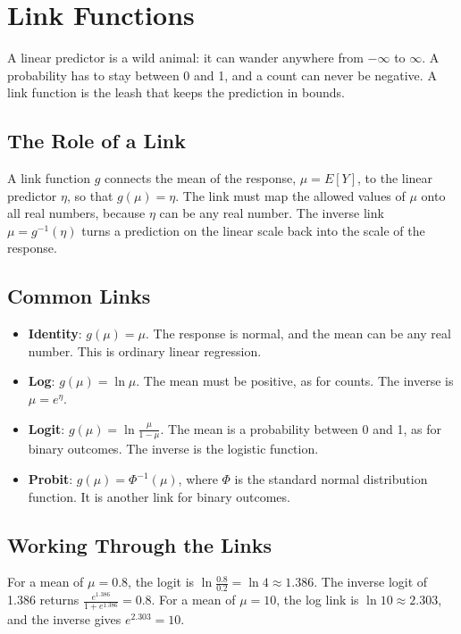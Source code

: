 \chapter{Link Functions}

A linear predictor is a wild animal: it can wander anywhere from $-\infty$ to
$\infty$. A probability has to stay between 0 and 1, and a count can never be
negative. A link function is the leash that keeps the prediction in bounds.

\section{The Role of a Link}
A link function $g$ connects the mean of the response, $\mu = E[Y]$, to the linear predictor $\eta$, so that $g(\mu) = \eta$.
The link must map the allowed values of $\mu$ onto all real numbers, because $\eta$ can be any real number. The
inverse link $\mu = g^{-1}(\eta)$ turns a prediction on the linear scale back into the scale of the response.

\section{Common Links}
\begin{itemize}
\item \textbf{Identity}: $g(\mu) = \mu$. The response is normal, and the mean can be any real number. This is ordinary linear regression.
\item \textbf{Log}: $g(\mu) = \ln \mu$. The mean must be positive, as for counts. The inverse is $\mu = e^{\eta}$.
\item \textbf{Logit}: $g(\mu) = \ln\frac{\mu}{1 - \mu}$. The mean is a probability between 0 and 1, as for binary outcomes. The inverse is the logistic function.
\item \textbf{Probit}: $g(\mu) = \Phi^{-1}(\mu)$, where $\Phi$ is the standard normal distribution function. It is another link for binary outcomes.
\end{itemize}

\section{Working Through the Links}
For a mean of $\mu = 0.8$, the logit is $\ln\frac{0.8}{0.2} = \ln 4 \approx 1.386$. The inverse logit of 1.386
returns $\frac{e^{1.386}}{1 + e^{1.386}} = 0.8$. For a mean of $\mu = 10$, the log link is $\ln 10 \approx 2.303$, and
the inverse gives $e^{2.303} = 10$.

